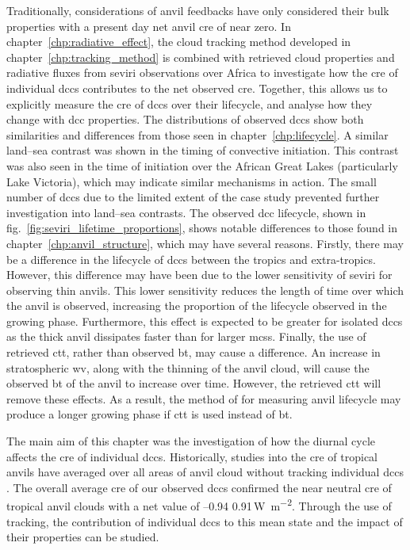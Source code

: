 Traditionally, considerations of anvil feedbacks have only considered their bulk properties with a present day net anvil \acrshort{cre} of near zero.
In chapter~\ref{chp:radiative_effect}, the cloud tracking method developed in chapter~\ref{chp:tracking_method} is combined with retrieved cloud properties and radiative fluxes from \acrshort{seviri} observations over Africa to investigate how the \acrshort{cre} of individual \acrshort{dcc}s contributes to the net observed \acrshort{cre}. 
Together, this allows us to explicitly measure the \acrshort{cre} of \acrshort{dcc}s over their lifecycle, and analyse how they change with \acrshort{dcc} properties.
The distributions of observed \acrshort{dcc}s show both similarities and differences from those seen in chapter~\ref{chp:lifecycle}.
A similar land--sea contrast was shown in the timing of convective initiation.
This contrast was also seen in the time of initiation over the African Great Lakes (particularly Lake Victoria), which may indicate similar mechanisms in action.
The small number of \acrshort{dcc}s due to the limited extent of the case study prevented further investigation into land--sea contrasts.
The observed \acrshort{dcc} lifecycle, shown in fig.~\ref{fig:seviri_lifetime_proportions}, shows notable differences to those found in chapter~\ref{chp:anvil_structure}, which may have several reasons.
Firstly, there may be a difference in the lifecycle of \acrshort{dcc}s between the tropics and extra-tropics.
However, this difference may have been due to the lower sensitivity of \acrshort{seviri} for observing thin anvils.
This lower sensitivity reduces the length of time over which the anvil is observed, increasing the proportion of the lifecycle observed in the growing phase.
Furthermore, this effect is expected to be greater for isolated \acrshort{dcc}s as the thick anvil dissipates faster than for larger \acrshort{mcs}s.
Finally, the use of retrieved \acrshort{ctt}, rather than observed \acrshort{bt}, may cause a difference.
An increase in stratospheric \acrshort{wv}, along with the thinning of the anvil cloud, will cause the observed \acrshort{bt} of the anvil to increase over time.
However, the retrieved \acrshort{ctt} will remove these effects.
As a result, the method of \citet{futyan_deep_2007} for measuring anvil lifecycle may produce a longer growing phase if \acrshort{ctt} is used instead of \acrshort{bt}.

The main aim of this chapter was the investigation of how the diurnal cycle affects the \acrshort{cre} of individual \acrshort{dcc}s.
Historically, studies into the \acrshort{cre} of tropical anvils have averaged over all areas of anvil cloud without tracking individual \acrshort{dcc}s \citep{ramanathan_cloud-radiative_1989, hartmann_effect_1992, stephens_cloudsat_2018}.
The overall average \acrshort{cre} of our observed \acrshort{dcc}s confirmed the near neutral \acrshort{cre} of tropical anvil clouds with a net value of --0.94\,\textpm\,0.91\,\unit{W m^{-2}}. 
Through the use of tracking, the contribution of individual \acrshort{dcc}s to this mean state and the impact of their properties can be studied.

